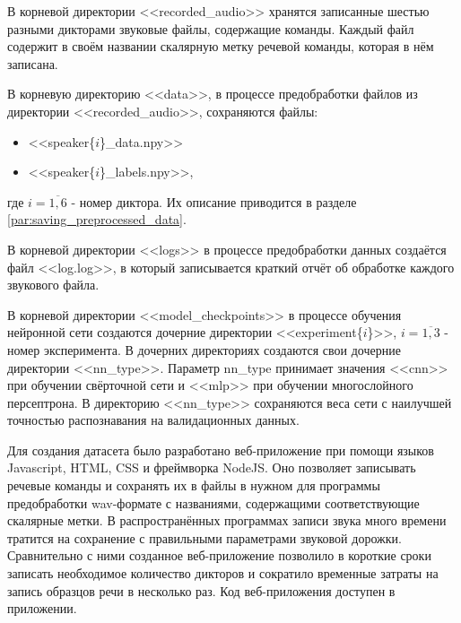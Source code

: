 В корневой директории <<recorded\_audio>> хранятся записанные шестью разными дикторами звуковые файлы, содержащие команды. Каждый файл содержит в своём названии скалярную метку речевой команды, которая в нём записана.

В корневую директорию <<data>>, в процессе предобработки файлов из директории <<recorded\_audio>>, сохраняются файлы:
\begin{itemize}[leftmargin=2cm]
	\item <<speaker\{$i$\}\_data.npy>>\footnotemark 
	\item <<speaker\{$i$\}\_labels.npy>>\footnotemark[\value{footnote}],
\end{itemize}
где  $i=\overline{1,6}$ - номер диктора. Их описание приводится в разделе \ref{par:saving_preprocessed_data}.

В корневой директории <<logs>> в процессе предобработки данных создаётся файл <<log.log>>, в который записывается краткий отчёт об обработке каждого звукового файла.

В корневой директории <<model\_checkpoints>> в процессе обучения нейронной сети создаются дочерние директории <<experiment\{$i$\}>>\footnotemark[\value{footnote}], $i=\overline{1,3}$ - номер эксперимента. В дочерних директориях создаются свои дочерние директории <<{nn\_type}>>. Параметр nn\_type принимает  значения <<cnn>> при обучении свёрточной сети и <<mlp>> при обучении многослойного персептрона. В директорию <<{nn\_type}>> сохраняются веса сети с наилучшей точностью распознавания на валидационных данных.


Для создания датасета было разработано веб-приложение при помощи языков Javascript, HTML, CSS и фреймворка NodeJS. Оно позволяет записывать речевые команды и сохранять их в файлы в нужном для программы предобработки wav-формате с названиями, содержащими соответствующие скалярные метки. В распространённых программах записи звука много времени тратится на сохранение с правильными параметрами звуковой дорожки. Сравнительно с ними созданное веб-приложение позволило в короткие сроки записать необходимое количество дикторов и сократило временные затраты на запись образцов речи в несколько раз. Код веб-приложения доступен в приложении.

